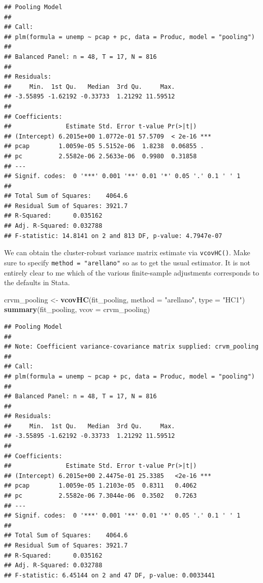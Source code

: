 \documentclass[12pt,oneside,openany]{book}
\newenvironment{Shaded}{\begin{snugshade}}{\end{snugshade}}
\newcommand{\KeywordTok}[1]{\textcolor[rgb]{0.13,0.29,0.53}{\textbf{#1}}}
\newcommand{\DataTypeTok}[1]{\textcolor[rgb]{0.13,0.29,0.53}{#1}}
\newcommand{\StringTok}[1]{\textcolor[rgb]{0.31,0.60,0.02}{#1}}
\newcommand{\NormalTok}[1]{#1}
\begin{document}
\begin{verbatim}
## Pooling Model
## 
## Call:
## plm(formula = unemp ~ pcap + pc, data = Produc, model = "pooling")
## 
## Balanced Panel: n = 48, T = 17, N = 816
## 
## Residuals:
##     Min.  1st Qu.   Median  3rd Qu.     Max. 
## -3.55895 -1.62192 -0.33733  1.21292 11.59512 
## 
## Coefficients:
##               Estimate Std. Error t-value Pr(>|t|)    
## (Intercept) 6.2015e+00 1.0772e-01 57.5709  < 2e-16 ***
## pcap        1.0059e-05 5.5152e-06  1.8238  0.06855 .  
## pc          2.5582e-06 2.5633e-06  0.9980  0.31858    
## ---
## Signif. codes:  0 '***' 0.001 '**' 0.01 '*' 0.05 '.' 0.1 ' ' 1
## 
## Total Sum of Squares:    4064.6
## Residual Sum of Squares: 3921.7
## R-Squared:      0.035162
## Adj. R-Squared: 0.032788
## F-statistic: 14.8141 on 2 and 813 DF, p-value: 4.7947e-07
\end{verbatim}

We can obtain the cluster-robust variance matrix estimate via
\texttt{vcovHC()}. Make sure to specify \texttt{method\ =\ "arellano"}
so as to get the usual estimator. It is not entirely clear to me which
of the various finite-sample adjustments corresponds to the defaults in
Stata.

\begin{Shaded}
\begin{Highlighting}[]
\NormalTok{crvm_pooling <-}\StringTok{ }\KeywordTok{vcovHC}\NormalTok{(fit_pooling,}
                       \DataTypeTok{method =} \StringTok{"arellano"}\NormalTok{,}
                       \DataTypeTok{type =} \StringTok{"HC1"}\NormalTok{)}
\KeywordTok{summary}\NormalTok{(fit_pooling, }\DataTypeTok{vcov =}\NormalTok{ crvm_pooling)}
\end{Highlighting}
\end{Shaded}

\begin{verbatim}
## Pooling Model
## 
## Note: Coefficient variance-covariance matrix supplied: crvm_pooling
## 
## Call:
## plm(formula = unemp ~ pcap + pc, data = Produc, model = "pooling")
## 
## Balanced Panel: n = 48, T = 17, N = 816
## 
## Residuals:
##     Min.  1st Qu.   Median  3rd Qu.     Max. 
## -3.55895 -1.62192 -0.33733  1.21292 11.59512 
## 
## Coefficients:
##               Estimate Std. Error t-value Pr(>|t|)    
## (Intercept) 6.2015e+00 2.4475e-01 25.3385   <2e-16 ***
## pcap        1.0059e-05 1.2103e-05  0.8311   0.4062    
## pc          2.5582e-06 7.3044e-06  0.3502   0.7263    
## ---
## Signif. codes:  0 '***' 0.001 '**' 0.01 '*' 0.05 '.' 0.1 ' ' 1
## 
## Total Sum of Squares:    4064.6
## Residual Sum of Squares: 3921.7
## R-Squared:      0.035162
## Adj. R-Squared: 0.032788
## F-statistic: 6.45144 on 2 and 47 DF, p-value: 0.0033441
\end{verbatim}
\end{document}
